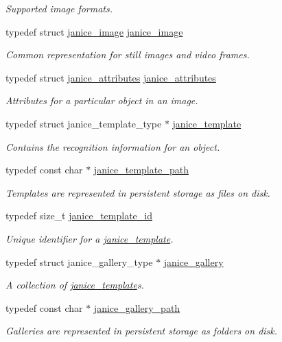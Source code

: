\begin{DoxyCompactItemize}
\begin{DoxyCompactList}\small\item\em Supported image formats. \end{DoxyCompactList}\item 
typedef struct \hyperlink{structjanice__image}{janice\+\_\+image} \hyperlink{group__janice_ga3f20c208762563c88c414664c21d654e}{janice\+\_\+image}
\begin{DoxyCompactList}\small\item\em Common representation for still images and video frames. \end{DoxyCompactList}\item 
typedef struct \hyperlink{structjanice__attributes}{janice\+\_\+attributes} \hyperlink{group__janice_gaf16b5ce9751b8450f61adb9a957b0fc2}{janice\+\_\+attributes}
\begin{DoxyCompactList}\small\item\em Attributes for a particular object in an image. \end{DoxyCompactList}\item 
typedef struct janice\+\_\+template\+\_\+type $\ast$ \hyperlink{group__janice_ga5593b06e86b90504968c0fc191ee2f3c}{janice\+\_\+template}
\begin{DoxyCompactList}\small\item\em Contains the recognition information for an object. \end{DoxyCompactList}\item 
typedef const char $\ast$ \hyperlink{group__janice_gafaa1c0182c7a56aaafea6e2bfe471cc8}{janice\+\_\+template\+\_\+path}
\begin{DoxyCompactList}\small\item\em Templates are represented in persistent storage as files on disk. \end{DoxyCompactList}\item 
typedef size\+\_\+t \hyperlink{group__janice_ga5ec62465fbbc7a92faadfefd3d20e25b}{janice\+\_\+template\+\_\+id}
\begin{DoxyCompactList}\small\item\em Unique identifier for a \hyperlink{group__janice_ga5593b06e86b90504968c0fc191ee2f3c}{janice\+\_\+template}. \end{DoxyCompactList}\item 
typedef struct janice\+\_\+gallery\+\_\+type $\ast$ \hyperlink{group__janice_ga08feff1c2835b44332afeda80c3d0fb7}{janice\+\_\+gallery}
\begin{DoxyCompactList}\small\item\em A collection of \hyperlink{group__janice_ga5593b06e86b90504968c0fc191ee2f3c}{janice\+\_\+template}s. \end{DoxyCompactList}\item 
typedef const char $\ast$ \hyperlink{group__janice_gac531556b0a1896b828209fe7fd843b90}{janice\+\_\+gallery\+\_\+path}
\begin{DoxyCompactList}\small\item\em Galleries are represented in persistent storage as folders on disk. \end{DoxyCompactList}\end{DoxyCompactItemize}

